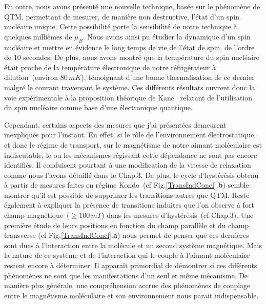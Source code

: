 En outre, nous avons présenté une nouvelle technique, basée sur le phénomène de QTM, permettant de mesurer, de manière non destructive, l'état d'un spin nucléaire unique. Cette possibilité porte la sensibilité de notre technique à quelques millièmes de $\mu_B$. Nous avons ainsi pu étudier la dynamique d'un spin nucléaire et mettre en évidence le long temps de vie de l'état de spin, de l'ordre de 10 secondes. De plus, nous avons montré que la température du spin nucléaire était proche de la température électronique de notre réfrigérateur à dilution~(environ 80$\,mK$), témoignant d'une bonne thermalisation de ce dernier malgré le courant traversant le système. Ces différents résultats ouvrent donc la voie expérimentale à la proposition théorique de Kane~\cite{Kane1998} relatant de l'utilisation du spin nucléaire comme base d'une électronique quantique.


Cependant, certains aspects des mesures que j'ai présentées demeurent inexpliqués pour l'instant. En effet, si le rôle de l’environnement électrostatique, et donc le régime de transport, sur le magnétisme de notre aimant moléculaire est indiscutable, le ou les mécanismes régissant cette dépendance ne sont pas encore identifiés. Il conduisent pourtant à une modification de la vitesse de relaxation comme nous l'avons détaillé dans le Chap.3. De plus, le cycle d’hystérésis obtenu à partir de mesures faites en régime Kondo~(cf Fig.\ref{TransIndConcl}.\textbf{b}) semble montrer qu'il est possible de supprimer les transitions autres que QTM.  Reste également à expliquer la présence de transitions induites que l'on observe à fort champ magnétique~($\geq 100\,mT$) dans les mesures d’hystérésis~(cf Chap.3). Une première étude de leurs positions en fonction du champ parallèle et du champ transverse (cf Fig.\ref{TransIndConcl}.\textbf{a}) nous permet de penser que ces dernières sont dues à l'interaction entre la molécule et un second système magnétique. Mais la nature de ce système et de l'interaction qui le couple à l'aimant moléculaire restent encore à déterminer. Il apparaît primordial de démontrer si ces différents phénomènes ne sont que les manifestations d'un seul et même mécanisme. De manière plus générale, une compréhension accrue des phénomènes de couplage entre le magnétisme moléculaire et son environnement nous parait indispensable.

